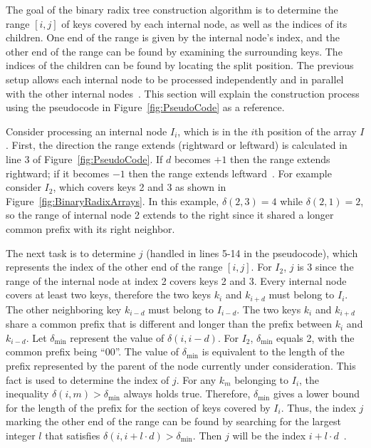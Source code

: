 \documentclass{sig-alternate}
\begin{document}
The goal of the binary radix tree construction algorithm is to determine the range $[i,j]$ of keys covered by each internal node, as well as the indices of its children. One end of the range is given by the internal node's index, and the other end of the range can be found by examining the surrounding keys. The indices of the children can be found by locating the split position. The previous setup allows each internal node to be processed independently and in parallel with the other internal nodes~\cite{Karras:2012}. This section will explain the construction process using the pseudocode in Figure~\ref{fig:PseudoCode} as a reference.

Consider processing an internal node $I_{i}$, which is in the $i$th position of the array $I$. First, the direction the range extends (rightward or leftward) is calculated in line 3 of Figure~\ref{fig:PseudoCode}. If $d$ becomes $+1$ then the range extends rightward; if it becomes $-1$ then the range extends leftward~\cite{Karras:2012}. For example consider $I_2$, which covers keys 2 and 3 as shown in Figure~\ref{fig:BinaryRadixArrays}. In this example, $\delta(2,3) = 4$ while $\delta(2,1) = 2$, so the range of internal node 2 extends to the right since it shared a longer common prefix with its right neighbor.

The next task is to determine $j$ (handled in lines 5-14 in the pseudocode), which represents the index of the other end of the range $[i,j]$. For $I_2$, $j$ is 3 since the range of the internal node at index 2 covers keys 2 and 3. Every internal node covers at least two keys, therefore the two keys $k_i$ and $k_{i+d}$ must belong to $I_i$. The other neighboring key $k_{i-d}$ must belong to $I_{i-d}$. The two keys $k_i$ and $k_{i+d}$ share a common prefix that is different and longer than the prefix between $k_i$ and $k_{i-d}$. Let $\delta_{\textrm{min}}$ represent the value of $\delta(i, i-d)$. For $I_2$, $\delta_{\textrm{min}}$ equals 2, with the common prefix being ``00''. The value of $\delta_{\textrm{min}}$ is equivalent to the length of the prefix represented by the parent of the node currently under consideration. This fact is used to determine the index of $j$. For any $k_m$ belonging to $I_i$, the inequality $\delta(i,m)>\delta_{\textrm{min}}$ always holds true. Therefore, $\delta_{\textrm{min}}$ gives a lower bound for the length of the prefix for the section of keys covered by $I_i$. Thus, the index $j$ marking the other end of the range can be found by searching for the largest integer $l$ that satisfies $\delta(i, i+l \cdot d)>\delta_{\textrm{min}}$. Then $j$ will be the index $i+l \cdot d$~\cite{Karras:2012}.
\end{document}
